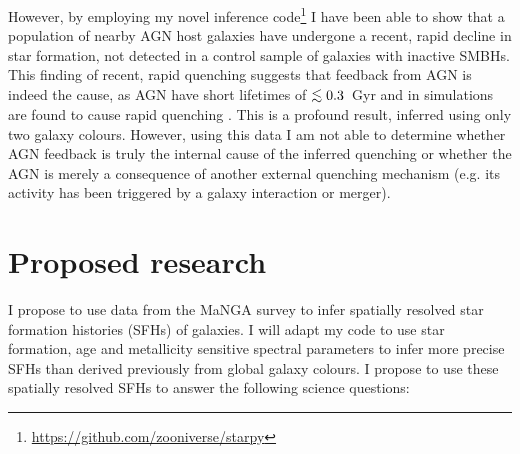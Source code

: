 \documentclass[11pt]{article}
\def\lesssim{\mathrel{\hbox{\rlap{\hbox{\lower3pt\hbox{$\sim$}}}\hbox{\raise2pt\hbox{$<$}}}}}
\begin{document}
However, by employing my novel inference code\footnote{\url{https://github.com/zooniverse/starpy}} I have been able to show that a population of nearby AGN host galaxies have undergone a recent, rapid decline in star formation, not detected in a control sample of galaxies with inactive SMBHs. This finding of recent, rapid quenching suggests that feedback from AGN is indeed the cause, as AGN have short lifetimes of $\lesssim0.3$~Gyr \citep{martini04} and in simulations are found to cause rapid quenching \citep{tortora09}. This is a profound result, inferred using only two galaxy colours. However, using this data I am not able to determine whether AGN feedback is truly the internal cause of the inferred quenching or whether the AGN is merely a consequence of another external quenching mechanism (e.g. its activity has been triggered by a galaxy interaction or merger). 


\vspace{-0.5em}
\section*{\large Proposed research}
\vspace{-0.5em}

I propose to use data from the MaNGA survey to infer spatially resolved star formation histories (SFHs) of galaxies. I will adapt my code to use star formation, age and metallicity sensitive spectral parameters %
to infer more precise SFHs than derived previously from global galaxy colours. I propose to use these spatially resolved SFHs to answer the following science questions:
\end{document}
